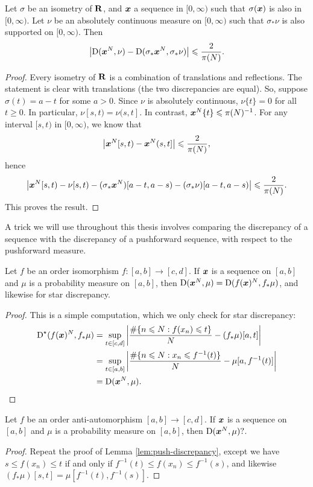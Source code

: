 \begin{lemma}\label{lem:flip-discrepancy}
Let $\sigma$ be an isometry of $\mathbf{R}$, and ${\boldsymbol x}$ a sequence in $[0,\infty)$ 
such that $\sigma({\boldsymbol x})$ is also in $[0,\infty)$. Let $\nu$ be an absolutely 
continuous measure on $[0,\infty)$ such that $\sigma_\ast \nu$ is also 
supported on $[0,\infty)$. Then 
\[
	\left|\operatorname{D}({\boldsymbol x}^N, \nu) - \operatorname{D}(\sigma_\ast {\boldsymbol x}^N, \sigma_\ast \nu)\right| \leqslant \frac{2}{\pi(N)} .
\]
\end{lemma}
\begin{proof}
Every isometry of $\mathbf{R}$ is a combination of translations and reflections. 
The statement is clear with translations (the two discrepancies are equal). So, 
suppose $\sigma(t) = a - t$ for some $a>0$. Since $\nu$ is absolutely 
continuous, $\nu\{t\}=0$ for all $t\geqslant 0$. In particular, 
$\nu[s,t) = \nu(s,t]$. In contrast, ${\boldsymbol x}^N\{t\}\leqslant \pi(N)^{-1}$. For any 
interval $[s,t)$ in $[0,\infty)$, we know that 
\[
	\left| {\boldsymbol x}^N[s,t) - {\boldsymbol x}^N(s,t]\right| \leqslant \frac{2}{\pi(N)}  ,
\]
hence 
\[
	\left| {\boldsymbol x}^N[s,t) - \nu[s,t) - (\sigma_\ast {\boldsymbol x}^N)[a-t,a-s) - (\sigma_\ast \nu)[a-t,a-s)\right| \leqslant \frac{2}{\pi(N)} .
\]
This proves the result. 
\end{proof}

A trick we will use throughout this thesis involves comparing the discrepancy 
of a sequence with the discrepancy of a pushforward sequence, with respect to 
the pushforward measure. 

\begin{lemma}\label{lem:push-discrepancy}
Let $f$ be an order isomorphism $f\colon [a,b] \to [c,d]$. If 
${\boldsymbol x}$ is a sequence on $[a,b]$ and $\mu$ is a probability measure on 
$[a,b]$, then 
$\operatorname{D}({\boldsymbol x}^N, \mu) = \operatorname{D}(f({\boldsymbol x})^N, f_\ast \mu)$, 
and likewise for star discrepancy. 
\end{lemma}
\begin{proof}
This is a simple computation, which we only check for star discrepancy: 
\begin{align*}
	\operatorname{D}^\star(f({\boldsymbol x})^N, f_\ast \mu)
		&= \sup_{t\in [c,d]} \left| \frac{\#\{n\leqslant N : f(x_n) \leqslant t\}}{N} - (f_\ast \mu)[a,t]\right| \\
		&= \sup_{t\in [a,b]} \left| \frac{\#\{n\leqslant N : x_n \leqslant f^{-1}(t)\}}{N} - \mu[a,f^{-1}(t)]\right| \\
		&= \operatorname{D}({\boldsymbol x}^N, \mu) .
\end{align*}
\end{proof}

\begin{lemma}\label{lem:pushforward-reverse}
Let $f$ be an order anti-automorphism $[a,b] \to [c,d]$. If ${\boldsymbol x}$ is a 
sequence on $[a,b]$ and $\mu$ is a probability measure on $[a,b]$, then 
$\operatorname{D}({\boldsymbol x}^N,\mu) ?$. 
\end{lemma}
\begin{proof}
Repeat the proof of Lemma \ref{lem:push-discrepancy}, except we have 
$s\leqslant f(x_n) \leqslant t$ if and only if 
$f^{-1}(t) \leqslant f(x_n) \leqslant f^{-1}(s)$, and likewise 
$(f_\ast\mu)[s,t] = \mu[f^{-1}(t),f^{-1}(s)]$. 
\end{proof}






